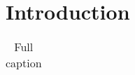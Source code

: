 \documentclass[pdf,12pt,report,strict]{SANDreport}
\begin{document}
    \SANDmain           %

    \chapter{Introduction}\label{Intro}

        \begin{table}[ht]
            \centering
            \caption[Short Title]{Full caption}
            \bigskip

            \begin{tabular}{|l|c|l|c|}
            \end{tabular}
            \label{tab:1}
        \end{table}




    \clearpage
    \providecommand*{\phantomsection}{}
    \phantomsection
    
    


    \appendix
    \chapter{}

\end{document}
